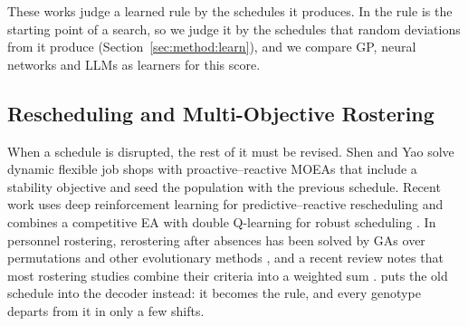 These works judge a learned rule by the schedules it produces.
In \RDD the rule is the starting point of a search, so we judge it by the schedules that random deviations from it produce (Section~\ref{sec:method:learn}), and we compare GP, neural networks and LLMs as learners for this score.

\subsection{Rescheduling and Multi-Objective Rostering}
\label{sec:related:resched}

When a schedule is disrupted, the rest of it must be revised.
Shen and Yao \cite{shen2015dfjsp} solve dynamic flexible job shops with proactive--reactive MOEAs that include a stability objective and seed the population with the previous schedule.
Recent work uses deep reinforcement learning for predictive--reactive rescheduling \cite{duan2025deep} and combines a competitive EA with double Q-learning for robust scheduling \cite{zhao2024dql}.
In personnel rostering, rerostering after absences has been solved by GAs over permutations \cite{moz2007genetic} and other evolutionary methods \cite{maenhout2011evolutionary},
and a recent review notes that most rostering studies combine their criteria into a weighted sum \cite{bodvarsdottir2026review}.
\RDD puts the old schedule into the decoder instead: it becomes the rule, and every genotype departs from it in only a few shifts.
